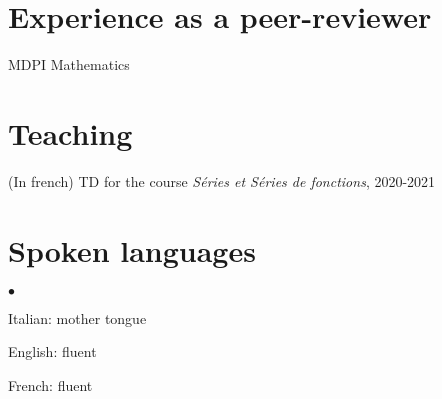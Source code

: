 \documentclass[margin,line,pifont,palatino,courier]{res}
\newenvironment{list2}{
  \begin{list}{$\bullet$}{%
      \setlength{\itemsep}{0in}
      \setlength{\parsep}{0in} \setlength{\parskip}{0in}
      \setlength{\topsep}{0in} \setlength{\partopsep}{0in}
      \setlength{\leftmargin}{0.2in}}}{\end{list}}
\begin{document}
\begin{resume}
\section{\sc Experience as a peer-reviewer} MDPI Mathematics

\section{\sc Teaching} (In french) TD for the course \emph{S\'eries et S\'eries de fonctions}, 2020-2021

\section{\sc Spoken languages} \begin{list2}
\vspace*{.05in}
\item  Italian: mother tongue
\item English: fluent
\item French: fluent
\end{list2}




\end{resume}
\end{document}
